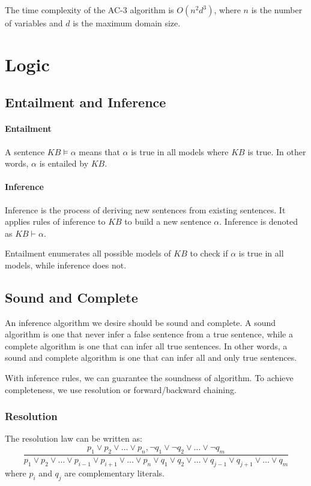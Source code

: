 \documentclass[a4paper,12pt]{article}
\begin{document}
The time complexity of the AC-3 algorithm is $O(n^2d^3)$, where $n$ is the number of variables and $d$ is the maximum domain size.

\section{Logic}

\subsection{Entailment and Inference}

\paragraph{Entailment} A sentence $KB \models \alpha$ means that $\alpha$ is true in all models where $KB$ is true. In other words, $\alpha$ is entailed by $KB$.

\paragraph{Inference} Inference is the process of deriving new sentences from existing sentences. It applies rules of inference to $KB$ to build a new sentence $\alpha$. Inference is denoted as $KB \vdash \alpha$.

Entailment enumerates all possible models of $KB$ to check if $\alpha$ is true in all models, while inference does not.

\subsection{Sound and Complete}

An inference algorithm we desire should be sound and complete. A sound algorithm is one that never infer a false sentence from a true sentence, while a complete algorithm is one that can infer all true sentences. In other words, a sound and complete algorithm is one that can infer all and only true sentences.

With inference rules, we can guarantee the soundness of algorithm. To achieve completeness, we use resolution or forward/backward chaining.

\subsubsection{Resolution}

The resolution law can be written as:
\begin{equation*}
  \frac{p_1 \lor p_2 \lor \ldots \lor p_n, \neg q_1 \lor \neg q_2 \lor \ldots \lor \neg q_m}{p_1 \lor p_2 \lor \ldots \lor p_{i-1} \lor p_{i+1} \lor \ldots \lor p_n \lor q_1 \lor q_2 \lor \ldots \lor q_{j-1} \lor q_{j+1} \lor \ldots \lor q_m}
\end{equation*}
where $p_i$ and $q_j$ are complementary literals.
\end{document}
